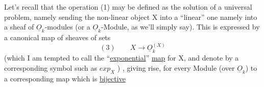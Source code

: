 Let's recall that the operation (1) may be defined as the solution
of a universal problem,  namely sending the non-linear object X into
a ``linear'' one namely into a sheaf of $\underline{O}_k$-modules (or a $\underline{O}_k$-Module,  as
we'll simply say).  This is expressed by a canonical  map of sheaves
of sets
\[ (3) \qquad X \longrightarrow \underline{O}_k^{(X)} \]
(which I am tempted to call the ``\uline{exponential}'' \uline{map} for X, and denote by
a corresponding symbol such as $exp_X$ ) ,  giving rise,  for every Module
(over $\underline{O}_k$)  to a corresponding map which is \uline{bijective}

